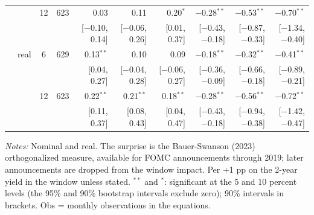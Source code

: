 \begin{longtable}{llcrrrrrrr}
 &  & 12 & 623 & 0.03 & 0.11 & 0.20$^{*}$ & $-$0.28$^{**}$ & $-$0.53$^{**}$ & $-$0.70$^{**}$\\
 & & & & {\scriptsize [$-$0.10, 0.14]} & {\scriptsize [$-$0.06, 0.26]} & {\scriptsize [0.01, 0.37]} & {\scriptsize [$-$0.43, $-$0.18]} & {\scriptsize [$-$0.87, $-$0.33]} & {\scriptsize [$-$1.34, $-$0.40]}\\
 & real & 6 & 629 & 0.13$^{**}$ & 0.10 & 0.09 & $-$0.18$^{**}$ & $-$0.32$^{**}$ & $-$0.41$^{**}$\\
 & & & & {\scriptsize [0.04, 0.27]} & {\scriptsize [$-$0.04, 0.28]} & {\scriptsize [$-$0.06, 0.27]} & {\scriptsize [$-$0.36, $-$0.09]} & {\scriptsize [$-$0.66, $-$0.18]} & {\scriptsize [$-$0.89, $-$0.21]}\\
 &  & 12 & 623 & 0.22$^{**}$ & 0.21$^{**}$ & 0.18$^{**}$ & $-$0.28$^{**}$ & $-$0.56$^{**}$ & $-$0.72$^{**}$\\
 & & & & {\scriptsize [0.11, 0.37]} & {\scriptsize [0.08, 0.43]} & {\scriptsize [0.04, 0.47]} & {\scriptsize [$-$0.43, $-$0.18]} & {\scriptsize [$-$0.94, $-$0.38]} & {\scriptsize [$-$1.42, $-$0.47]}\\
\end{longtable}
\begin{flushleft}\footnotesize\textit{Notes:} Nominal and real. The surprise is the Bauer-Swanson (2023) orthogonalized measure, available for FOMC announcements through 2019; later announcements are dropped from the window impact. Per +1 pp on the 2-year yield in the window unless stated. $^{**}$ and $^{*}$: significant at the 5 and 10 percent levels (the 95\% and 90\% bootstrap intervals exclude zero); 90\% intervals in brackets. Obs = monthly observations in the equations.\end{flushleft}
\endgroup
